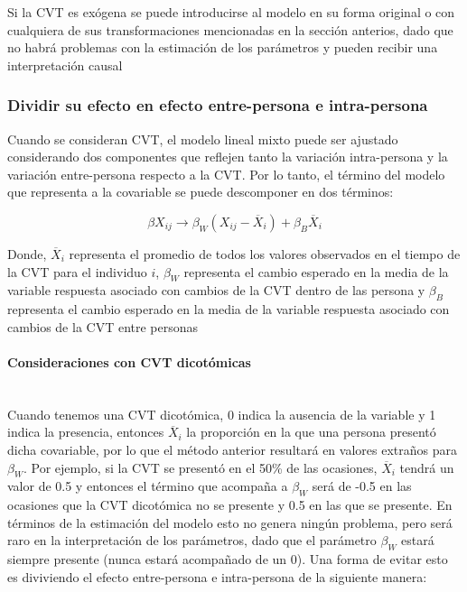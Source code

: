 \documentclass[spanish]{article}
\numberwithin{figure}{subsection}
\numberwithin{equation}{subsection}
\numberwithin{table}{subsection}
\begin{document}
Si la CVT es exógena se puede introducirse al modelo en su forma original o con
cualquiera de sus transformaciones mencionadas en la sección anterios, dado que
no habrá problemas con la estimación de los parámetros y pueden recibir una
interpretación causal

\subsubsection{Dividir su efecto en efecto entre-persona e intra-persona}

Cuando se consideran CVT, el modelo lineal mixto puede ser ajustado considerando
dos componentes que reflejen tanto la variación intra-persona y la variación
entre-persona respecto a la CVT. Por lo tanto, el término del modelo que
representa a la covariable se puede descomponer en dos términos:

\[
	\beta X_{ij} \rightarrow \beta_W (X_{ij} - \overline{X}_i)
	+ \beta_B \overline{X}_i
\]

Donde, $\overline{X}_i$ representa el promedio de todos los valores observados
en el tiempo de la CVT para el individuo $i$, $\beta_W$ representa el cambio
esperado en la media de la variable respuesta asociado con cambios de la CVT
dentro de las persona y $\beta_B$ representa el cambio esperado en la media de
la variable respuesta asociado con cambios de la CVT entre personas

\paragraph{Consideraciones con CVT dicotómicas} \mbox{} \\

Cuando tenemos una CVT dicotómica, 0 indica la ausencia de la variable y 1
indica la presencia, entonces $\overline{X}_i$ la proporción en la que una
persona presentó dicha covariable, por lo que el método anterior resultará en
valores extraños para $\beta_W$. Por ejemplo, si la CVT se presentó en el 50\%
de las ocasiones, $\overline{X}_i$ tendrá un valor de 0.5 y entonces el término
que acompaña a $\beta_W$ será de -0.5 en las ocasiones que la CVT dicotómica no
se presente y 0.5 en las que se presente. En términos de la estimación del
modelo esto no genera ningún problema, pero será raro en la interpretación de
los parámetros, dado que el parámetro $\beta_W$ estará siempre presente (nunca
estará acompañado de un 0). Una forma de evitar esto es diviviendo el efecto
entre-persona e intra-persona de la siguiente manera:
\end{document}
